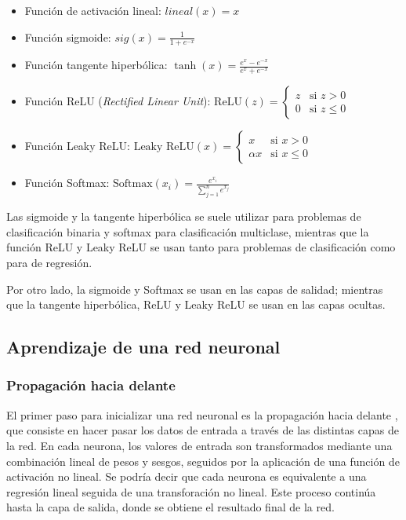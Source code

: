 \documentclass[12pt,twoside]{article}
\begin{document}
\begin{itemize}
    \item Función de activación lineal: $lineal(x) = x$
    \item Función sigmoide: $sig(x) = \frac{1}{1 + e^{-x}}$
    \item Función tangente hiperbólica: $\tanh(x) = \frac{e^{x} - e^{-x}}{e^{x} + e^{-x}}$
    \item Función ReLU (\textit{Rectified Linear Unit}): $\text{ReLU}(z) =
    \begin{cases} 
    z & \text{si } z > 0 \\
    0 & \text{si } z \leq 0
    \end{cases}$
    \item Función Leaky ReLU: $\text{Leaky ReLU}(x) = \begin{cases} 
    x & \text{si } x > 0 \\
    \alpha x & \text{si } x \leq 0 
    \end{cases}$
    \item Función Softmax: $\text{Softmax}(x_i) = \frac{e^{x_i}}{\sum_{j=1}^{n} e^{x_j}}$
\end{itemize}

Las sigmoide y la tangente hiperbólica se suele utilizar para problemas de clasificación binaria y softmax para clasificación multiclase, mientras que la función ReLU y Leaky ReLU se usan tanto para problemas de clasificación como para de regresión.

Por otro lado, la sigmoide y Softmax se usan en las capas de salidad; mientras que la tangente hiperbólica, ReLU y Leaky ReLU se usan en las capas ocultas.

\subsection{Aprendizaje de una red neuronal}\label{sec:11}
\subsubsection{Propagación hacia delante}\label{sec:12}

El primer paso para inicializar una red neuronal es la propagación hacia delante \cite{redes2}, que consiste en hacer pasar los datos de entrada a través de las distintas capas de la red. En cada neurona, los valores de entrada son transformados mediante una combinación lineal de pesos y sesgos, seguidos por la aplicación de una función de activación no lineal. Se podría decir que cada neurona es equivalente a una regresión lineal seguida de una transforación no lineal. Este proceso continúa hasta la capa de salida, donde se obtiene el resultado final de la red.
\end{document}
